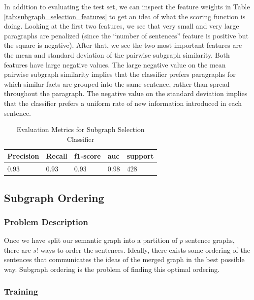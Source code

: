 \documentclass[12pt]{article}
\begin{document}
In addition to evaluating the test set, we can inspect the feature weights in Table \ref{tab:subgraph_selection_features} to get an idea of what the scoring function is doing. Looking at the first two features, we see that very small and very large paragraphs are penalized (since the ``number of sentences'' feature is positive but the square is negative). After that, we see the two most important features are the mean and standard deviation of the pairwise subgraph similarity. Both features have large negative values. The large negative value on the mean pairwise subgraph similarity implies that the classifier prefers paragraphs for which similar facts are grouped into the same sentence, rather than spread throughout the paragraph. The negative value on the standard deviation implies that the classifier prefers a uniform rate of new information introduced in each sentence.

\begin{table}[H]
\centering
\caption{Evaluation Metrics for Subgraph Selection Classifier}
\label{tab:subgraph_selection_eval}
\begin{tabular}{@{}lllll@{}}
\toprule
\textbf{Precision} & \textbf{Recall} & \textbf{f1-score} & \textbf{auc} & \textbf{support} \\ \midrule
0.93               & 0.93            & 0.93              & 0.98         & 428              \\ \bottomrule
\end{tabular}
\end{table}

\subsection{Subgraph Ordering}
\subsubsection{Problem Description}

Once we have split our semantic graph into a partition of $p$ sentence graphs, there are
$s!$ ways to order the sentences. Ideally, there exists some ordering of the
sentences that communicates the ideas of the merged graph in the best possible
way. Subgraph ordering is the problem of finding this optimal ordering.

\subsubsection{Training}
\end{document}
